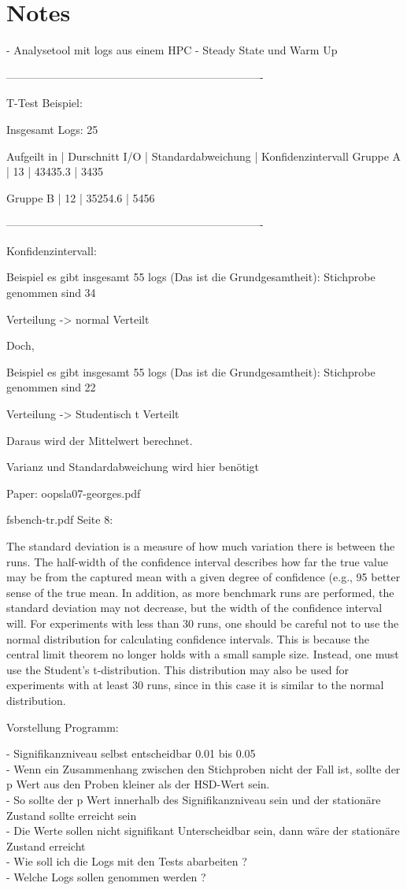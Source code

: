 \section{Notes}

- Analysetool mit logs aus einem HPC
- Steady State und Warm Up

----------------------------------------------------------------------

T-Test Beispiel:

Insgesamt Logs: 25

Aufgeilt in 	| Durschnitt I/O | Standardabweichung | Konfidenzintervall
Gruppe A | 13	| 43435.3	 | 3435

Gruppe B | 12	| 35254.6	 | 5456	

----------------------------------------------------------------------

Konfidenzintervall:

Beispiel es gibt insgesamt 55 logs (Das ist die Grundgesamtheit):
Stichprobe genommen sind 34

Verteilung -> normal Verteilt

Doch,

Beispiel es gibt insgesamt 55 logs (Das ist die Grundgesamtheit):
Stichprobe genommen sind 22

Verteilung -> Studentisch t Verteilt

Daraus wird der Mittelwert berechnet.

Varianz und Standardabweichung wird hier benötigt

Paper: oopsla07-georges.pdf

fsbench-tr.pdf Seite 8:

The standard deviation is a measure of how much variation there is between the
runs. The half-width of the confidence interval describes how far the true value may be
from the captured mean with a given degree of confidence (e.g., 95%
better sense of the true mean. In addition, as more benchmark runs are performed, the
standard deviation may not decrease, but the width of the confidence interval will.
For experiments with less than 30 runs, one should be careful not to use the normal
distribution for calculating confidence intervals. This is because the central limit theorem
no longer holds with a small sample size. Instead, one must use the Student’s t-distribution.
This distribution may also be used for experiments with at least 30 runs, since in this case
it is similar to the normal distribution.

Vorstellung Programm:

- Signifikanzniveau selbst entscheidbar 0.01 bis 0.05 \\
- Wenn ein Zusammenhang zwischen den Stichproben nicht der Fall ist, sollte der p Wert aus den Proben kleiner als der HSD-Wert sein.\\
- So sollte der p Wert innerhalb des Signifikanzniveau sein und der stationäre Zustand sollte erreicht sein\\
- Die Werte sollen nicht signifikant Unterscheidbar sein, dann wäre der stationäre Zustand erreicht\\
- Wie soll ich die Logs mit den Tests abarbeiten ?\\
- Welche Logs sollen genommen werden ? 
